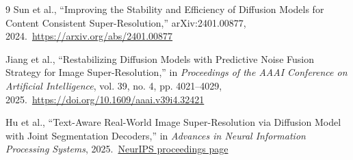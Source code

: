 \documentclass[11pt]{article}
\begin{document}
\enlargethispage{4\baselineskip}
\begingroup
\footnotesize
\setlength{\itemsep}{0pt}
\begin{thebibliography}{9}
Sun et al., ``Improving the Stability and Efficiency of Diffusion Models for Content Consistent Super-Resolution,'' arXiv:2401.00877, 2024.\
\url{https://arxiv.org/abs/2401.00877}

Jiang et al., ``Restabilizing Diffusion Models with Predictive Noise Fusion Strategy for Image Super-Resolution,'' in \emph{Proceedings of the AAAI Conference on Artificial Intelligence}, vol. 39, no. 4, pp. 4021--4029, 2025.\
\url{https://doi.org/10.1609/aaai.v39i4.32421}

Hu et al., ``Text-Aware Real-World Image Super-Resolution via Diffusion Model with Joint Segmentation Decoders,'' in \emph{Advances in Neural Information Processing Systems}, 2025.\
\href{https://proceedings.neurips.cc/paper_files/paper/2025/hash/58ce6a4b9c16d11975f11e4a23871041-Abstract-Conference.html}{NeurIPS proceedings page}
\end{thebibliography}
\endgroup
\end{document}
